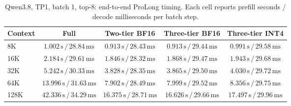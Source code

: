 \begin{table}[t]
\centering
\small
\caption{Qwen3.8, TP1, batch 1, top-8: end-to-end ProLong timing. Each cell reports prefill seconds / decode milliseconds per batch step.}
\label{tab:prolong-qwen38-tp1-b1-end-to-end}
\begin{tabular}{lcccc}
\toprule
Context & Full & Two-tier BF16 & Three-tier BF16 & Three-tier INT4 \\
\midrule
8K & \(1.002\,\mathrm{s}\,/\,28.84\,\mathrm{ms}\) & \(0.913\,\mathrm{s}\,/\,28.43\,\mathrm{ms}\) & \(0.913\,\mathrm{s}\,/\,29.44\,\mathrm{ms}\) & \(0.991\,\mathrm{s}\,/\,29.58\,\mathrm{ms}\) \\
16K & \(2.184\,\mathrm{s}\,/\,29.61\,\mathrm{ms}\) & \(1.846\,\mathrm{s}\,/\,28.32\,\mathrm{ms}\) & \(1.868\,\mathrm{s}\,/\,29.47\,\mathrm{ms}\) & \(1.943\,\mathrm{s}\,/\,29.68\,\mathrm{ms}\) \\
32K & \(5.242\,\mathrm{s}\,/\,30.33\,\mathrm{ms}\) & \(3.828\,\mathrm{s}\,/\,28.35\,\mathrm{ms}\) & \(3.865\,\mathrm{s}\,/\,29.50\,\mathrm{ms}\) & \(4.030\,\mathrm{s}\,/\,29.72\,\mathrm{ms}\) \\
64K & \(13.996\,\mathrm{s}\,/\,31.63\,\mathrm{ms}\) & \(7.902\,\mathrm{s}\,/\,28.49\,\mathrm{ms}\) & \(7.999\,\mathrm{s}\,/\,29.52\,\mathrm{ms}\) & \(8.356\,\mathrm{s}\,/\,29.75\,\mathrm{ms}\) \\
128K & \(42.336\,\mathrm{s}\,/\,34.29\,\mathrm{ms}\) & \(16.375\,\mathrm{s}\,/\,28.71\,\mathrm{ms}\) & \(16.626\,\mathrm{s}\,/\,29.66\,\mathrm{ms}\) & \(17.497\,\mathrm{s}\,/\,29.96\,\mathrm{ms}\) \\
\bottomrule
\end{tabular}
\end{table}

